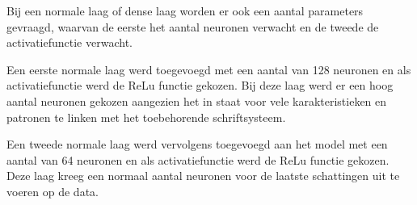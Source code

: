 Bij een normale laag of dense laag worden er ook een aantal parameters gevraagd, waarvan de eerste het aantal neuronen verwacht en de tweede de activatiefunctie verwacht.

Een eerste normale laag werd toegevoegd met een aantal van 128 neuronen en als activatiefunctie werd de ReLu functie gekozen.
Bij deze laag werd er een hoog aantal neuronen gekozen aangezien het in staat voor vele karakteristieken en patronen te linken met het toebehorende schriftsysteem.

Een tweede normale laag werd vervolgens toegevoegd aan het model met een aantal van 64 neuronen en als activatiefunctie werd de ReLu functie gekozen.
Deze laag kreeg een normaal aantal neuronen voor de laatste schattingen uit te voeren op de data.














 














